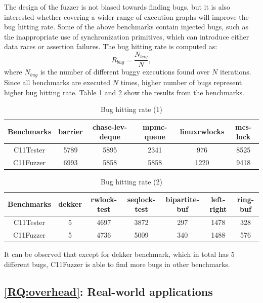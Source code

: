 The design of the fuzzer is not biased towards finding bugs, but it is also interested whether covering a wider range of execution graphs will improve the bug hitting rate. Some of the above benchmarks contain injected bugs, such as the inappropriate use of synchronization primitives, which can introduce either data races or assertion failures. The bug hitting rate is computed as:
\[
	R_{bug} = \frac{N_{bug}}{N},
\]
where $N_{bug}$ is the number of different buggy executions found over $N$ iterations. Since all benchmarks are executed $N$ times, higher number of bugs represent higher bug hitting rate. Table \ref{buggy1} and \ref{buggy2} show the results from the benchmarks.


\begin{table}[h!]
	\begin{tabular}{ |c|ccccc| }
		\hline
		Benchmarks & barrier & chase-lev-deque & mpmc-queue & linuxrwlocks & mcs-lock \\
		\hline
		C11Tester  & 5789    & 5895            & 2341       & 976          & 8525     \\
		C11Fuzzer  & 6993    & 5858            & 5858       & 1220         & 9418     \\
		\hline
	\end{tabular}
	\caption{Bug hitting rate (1)}
	\label{buggy1}

\end{table}

\begin{table}[h!]
	\begin{tabular}{ |c|cccccc| }
		\hline
		Benchmarks & dekker & rwlock-test & seqlock-test & bipartite-buf & left-right & ring-buf \\
		\hline
		C11Tester  & 5      & 4697        & 3872         & 297           & 1478       & 328      \\
		C11Fuzzer  & 5      & 4736        & 5009         & 340           & 1488       & 576      \\
		\hline
	\end{tabular}
	\caption{Bug hitting rate (2)}
	\label{buggy2}
\end{table}

It can be observed that except for dekker benchmark, which in total has 5 different bugs, C11Fuzzer is able to find more bugs in other benchmarks.


\subsection{\ref*{RQ:overhead}: Real-world applications}

